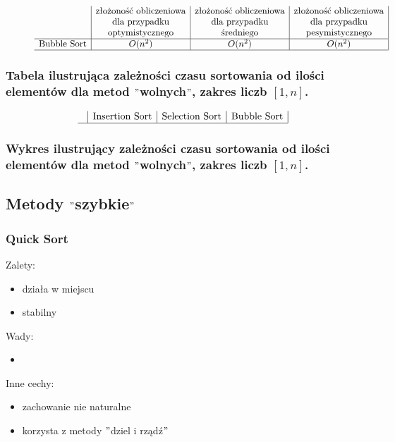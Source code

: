 \documentclass[polish,polish,a4paper]{article}
\begin{document}
\begin{spacing}{1.5}
\begin{figure}[H]
\begin{equation*}
\begin{array}{l|c|c|c|}
		&$złożoność obliczeniowa$&$złożoność obliczeniowa$&$złożoność obliczeniowa$\\
		&$dla przypadku$&$dla przypadku$&$dla przypadku$\\
		&$optymistycznego$&$średniego$&$pesymistycznego$\\
		\hline
		$Bubble Sort$&O(n^2)&O(n^2)&O(n^2)\\
		\hline
		\end{array}
		\end{equation*}
	\end{figure}

	\subsubsection*{Tabela ilustrująca zależności czasu sortowania od ilości elementów dla metod $"$wolnych$"$, zakres liczb $ [1,n] $.}
	
	\begin{figure}[H]
			\begin{equation*}
		\begin{array}{l|c|c|c|}

		&$Insertion Sort$&$Selection Sort$&$Bubble Sort$\\
		\hline
		\end{array}
		\end{equation*}
	\end{figure}
	
	\subsubsection*{Wykres ilustrujący zależności czasu sortowania od ilości elementów dla metod $"$wolnych$"$, zakres liczb $ [1,n] $.}
	
	\subsection{Metody $"$szybkie$"$}


		\subsubsection*{Quick Sort}
	Zalety:
	\begin{itemize}
		\item działa w miejscu
		\item stabilny 
	\end{itemize}
	Wady:
	\begin{itemize}
		\item 
	\end{itemize}
	Inne cechy:
	\begin{itemize}
		\item zachowanie nie naturalne
		\item korzysta z metody $"$dziel i rządź$"$
	\end{itemize}
	

\end{spacing}
\end{document}
